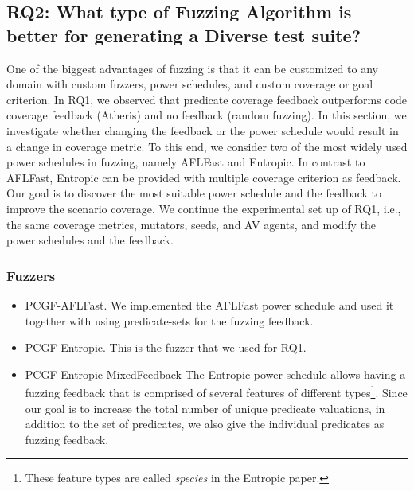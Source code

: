 \subsection{RQ2: What type of Fuzzing Algorithm is better for generating a Diverse test suite?}


One of the biggest advantages of fuzzing is that it can be customized to any domain with custom fuzzers, power schedules, and custom coverage or goal criterion.
% 
In RQ1, we observed that predicate coverage feedback outperforms code coverage feedback (Atheris) and no feedback (random fuzzing).
% 
In this section, we investigate whether changing the feedback or the power schedule would result in a change in coverage metric.
% 
To this end, we consider two of the most widely used power schedules in fuzzing, namely AFLFast and Entropic. 
% 
In contrast to AFLFast, Entropic can be provided with multiple coverage criterion as feedback.
% 
Our goal is to discover the most suitable power schedule and the feedback to improve the scenario coverage. 
%
We continue the experimental set up of RQ1, i.e., the same coverage metrics, mutators, seeds, and AV agents, and modify the power schedules and the feedback.


\subsubsection{Fuzzers}
\begin{itemize}
    \item PCGF-AFLFast.
    We implemented the AFLFast power schedule \cite{Zeller.2023} and used it together with using predicate-sets for the fuzzing feedback.

    \item PCGF-Entropic.
    This is the fuzzer that we used for RQ1.

    \item PCGF-Entropic-MixedFeedback
    The Entropic power schedule allows having a fuzzing feedback that is comprised of several features of different types\footnote{These feature types are called \emph{species} in the Entropic paper.}.
    Since our goal is to increase the total number of unique predicate valuations, in addition to the set of predicates, we also give the individual predicates as fuzzing feedback.

\end{itemize}



